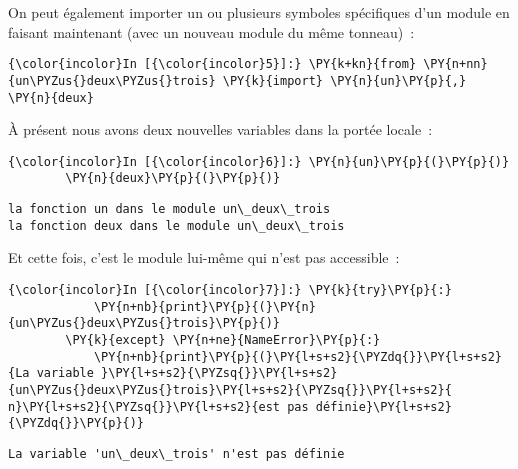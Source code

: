     On peut également importer un ou plusieurs symboles spécifiques d'un
module en faisant maintenant (avec un nouveau module du même tonneau)~:

    \begin{Verbatim}[commandchars=\\\{\},frame=single,framerule=0.3mm,rulecolor=\color{cellframecolor}]
{\color{incolor}In [{\color{incolor}5}]:} \PY{k+kn}{from} \PY{n+nn}{un\PYZus{}deux\PYZus{}trois} \PY{k}{import} \PY{n}{un}\PY{p}{,} \PY{n}{deux}
\end{Verbatim}


    À présent nous avons deux nouvelles variables dans la portée locale~:

    \begin{Verbatim}[commandchars=\\\{\},frame=single,framerule=0.3mm,rulecolor=\color{cellframecolor}]
{\color{incolor}In [{\color{incolor}6}]:} \PY{n}{un}\PY{p}{(}\PY{p}{)}
        \PY{n}{deux}\PY{p}{(}\PY{p}{)}
\end{Verbatim}


    \begin{Verbatim}[commandchars=\\\{\},frame=single,framerule=0.3mm,rulecolor=\color{cellframecolor}]
la fonction un dans le module un\_deux\_trois
la fonction deux dans le module un\_deux\_trois
\end{Verbatim}

    Et cette fois, c'est le module lui-même qui n'est pas accessible~:

    \begin{Verbatim}[commandchars=\\\{\},frame=single,framerule=0.3mm,rulecolor=\color{cellframecolor}]
{\color{incolor}In [{\color{incolor}7}]:} \PY{k}{try}\PY{p}{:}
            \PY{n+nb}{print}\PY{p}{(}\PY{n}{un\PYZus{}deux\PYZus{}trois}\PY{p}{)}
        \PY{k}{except} \PY{n+ne}{NameError}\PY{p}{:}
            \PY{n+nb}{print}\PY{p}{(}\PY{l+s+s2}{\PYZdq{}}\PY{l+s+s2}{La variable }\PY{l+s+s2}{\PYZsq{}}\PY{l+s+s2}{un\PYZus{}deux\PYZus{}trois}\PY{l+s+s2}{\PYZsq{}}\PY{l+s+s2}{ n}\PY{l+s+s2}{\PYZsq{}}\PY{l+s+s2}{est pas définie}\PY{l+s+s2}{\PYZdq{}}\PY{p}{)}
\end{Verbatim}


    \begin{Verbatim}[commandchars=\\\{\},frame=single,framerule=0.3mm,rulecolor=\color{cellframecolor}]
La variable 'un\_deux\_trois' n'est pas définie
\end{Verbatim}

